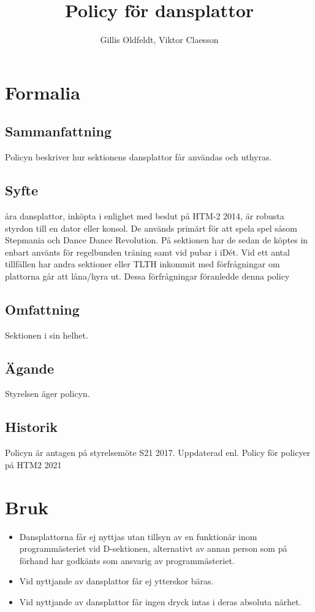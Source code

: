 \documentclass{dsekprotokoll}
\title{Policy för dansplattor}
\author{Gillis Oldfeldt, Viktor Claesson}
\begin{document}
\maketitle
\section{Formalia}
\subsection{Sammanfattning}
Policyn beskriver hur sektionens dansplattor får användas och uthyras.
\subsection{Syfte}
åra dansplattor, inköpta i enlighet med beslut på HTM-2 2014, är robusta styrdon till en dator
eller konsol. De används primärt för att spela spel såsom Stepmania och Dance Dance Revolution. På sektionen har de sedan de köptes in enbart använts för regelbunden träning samt vid
pubar i iDét. Vid ett antal tillfällen har andra sektioner eller TLTH inkommit med förfrågningar
om plattorna går att låna/hyra ut. Dessa förfrågningar föranledde denna policy

\subsection{Omfattning}
Sektionen i sin helhet.
\subsection{Ägande}
Styrelsen äger policyn.
\subsection{Historik}
Policyn är antagen på styrelsemöte S21 2017.
Uppdaterad enl. Policy för policyer på HTM2 2021

\section{Bruk}
\begin{itemize}
    \item Dansplattorna får ej nyttjas utan tillsyn av en funktionär inom programmästeriet vid D-sektionen, alternativt av annan person som på förhand har godkänts som ansvarig av programmästeriet.
    \item Vid nyttjande av dansplattor får ej ytterskor bäras.
    \item Vid nyttjande av dansplattor får ingen dryck intas i deras absoluta närhet.
\end{itemize}
\end{document}
